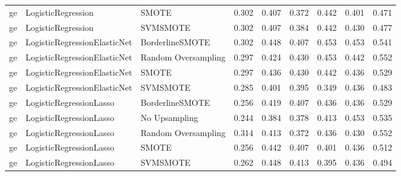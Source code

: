 \begin{tabular}{lllllllll}
      ge &           LogisticRegression &               SMOTE &     0.302 &                     0.407 &                 0.372 &                  0.442 &                                   0.401 &     0.471 \\
      ge &           LogisticRegression &            SVMSMOTE &     0.302 &                     0.407 &                 0.384 &                  0.442 &                                   0.430 &     0.477 \\
      ge & LogisticRegressionElasticNet &     BorderlineSMOTE &     0.302 &                     0.448 &                 0.407 &                  0.453 &                                   0.453 &     0.541 \\
      ge & LogisticRegressionElasticNet & Random Oversampling &     0.297 &                     0.424 &                 0.430 &                  0.453 &                                   0.442 &     0.552 \\
      ge & LogisticRegressionElasticNet &               SMOTE &     0.297 &                     0.436 &                 0.430 &                  0.442 &                                   0.436 &     0.529 \\
      ge & LogisticRegressionElasticNet &            SVMSMOTE &     0.285 &                     0.401 &                 0.395 &                  0.349 &                                   0.436 &     0.483 \\
      ge &      LogisticRegressionLasso &     BorderlineSMOTE &     0.256 &                     0.419 &                 0.407 &                  0.436 &                                   0.436 &     0.529 \\
      ge &      LogisticRegressionLasso &       No Upsampling &     0.244 &                     0.384 &                 0.378 &                  0.413 &                                   0.453 &     0.535 \\
      ge &      LogisticRegressionLasso & Random Oversampling &     0.314 &                     0.413 &                 0.372 &                  0.436 &                                   0.430 &     0.552 \\
      ge &      LogisticRegressionLasso &               SMOTE &     0.256 &                     0.442 &                 0.407 &                  0.401 &                                   0.436 &     0.512 \\
      ge &      LogisticRegressionLasso &            SVMSMOTE &     0.262 &                     0.448 &                 0.413 &                  0.395 &                                   0.436 &     0.494 \\

\end{tabular}
